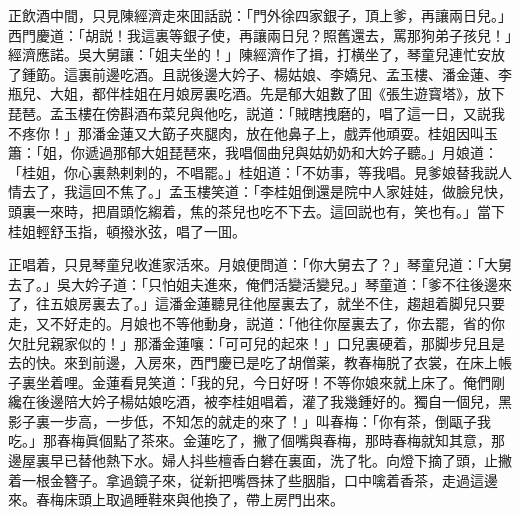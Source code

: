 正飲酒中間，只見陳經濟走來囬話説：「門外徐四家銀子，頂上爹，再讓兩日兒。」西門慶道：「胡説！我這裏等銀子使，再讓兩日兒？照舊還去，罵那狗弟子孩兒！」經濟應諾。吳大舅讓：「姐夫坐的！」陳經濟作了揖，打横坐了，琴童兒連忙安放了鍾筯。這裏前邊吃酒。且説後邊大妗子、楊姑娘、李嬌兒、孟玉樓、潘金蓮、李瓶兒、大姐，都伴桂姐在月娘房裏吃酒。先是郁大姐數了囬《張生遊寳塔》，放下琵琶。孟玉樓在傍斟酒布菜兒與他吃，説道：「賊瞎拽磨的，唱了這一日，又説我不疼你！」那潘金蓮又大筯子夾腿肉，放在他鼻子上，戲弄他頑耍。桂姐因叫玉簫：「姐，你遞過那郁大姐琵琶來，我唱個曲兒與姑奶奶和大妗子聽。」月娘道：「桂姐，你心裏熱剌剌的，不唱罷。」桂姐道：「不妨事，等我唱。見爹娘替我説人情去了，我這回不焦了。」孟玉樓笑道：「李桂姐倒還是院中人家娃娃，做臉兒快，頭裏一來時，把眉頭忔縐着，焦的茶兒也吃不下去。這回説也有，笑也有。」當下桂姐輕舒玉指，頓撥氷弦，唱了一囬。

正唱着，只見琴童兒收進家活來。月娘便問道：「你大舅去了？」琴童兒道：「大舅去了。」吳大妗子道：「只怕姐夫進來，俺們活變活變兒。」琴童道：「爹不往後邊來了，往五娘房裏去了。」這潘金蓮聽見往他屋裏去了，就坐不住，趨趄着脚兒只要走，又不好走的。月娘也不等他動身，説道：「他往你屋裏去了，你去罷，省的你欠肚兒親家似的！」那潘金蓮嚷：「可可兒的起來！」口兒裏硬着，那脚步兒且是去的快。來到前邊，入房來，西門慶已是吃了胡僧薬，教春梅脱了衣裳，在床上帳子裏坐着哩。金蓮看見笑道：「我的兒，今日好呀！不等你娘來就上床了。俺們剛纔在後邊陪大妗子楊姑娘吃酒，被李桂姐唱着，灌了我幾鍾好的。獨自一個兒，黑影子裏一步高，一步低，不知怎的就走的來了！」叫春梅：「你有茶，倒甌子我吃。」那春梅眞個點了茶來。金蓮吃了，撇了個嘴與春梅，那時春梅就知其意，那邊屋裏早已替他熱下水。婦人抖些檀香白礬在裏面，洗了牝。向燈下摘了頭，止撇着一根金簪子。拿過鏡子來，従新把嘴唇抹了些胭脂，口中噙着香茶，走過這邊來。春梅床頭上取過睡鞋來與他換了，帶上房門出來。

